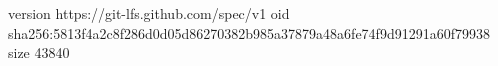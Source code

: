 version https://git-lfs.github.com/spec/v1
oid sha256:5813f4a2c8f286d0d05d86270382b985a37879a48a6fe74f9d91291a60f79938
size 43840
